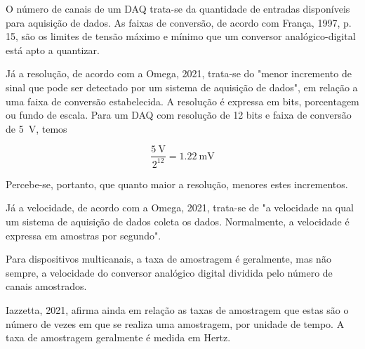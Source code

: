 \documentclass[
	12pt,				
	oneside,			
	a4paper,			
	english,			
	brazil,			
	]{abntex2ppgsi}
\begin{document}
O número de canais de um DAQ trata-se da quantidade de entradas disponíveis para aquisição de dados. As faixas de conversão, de acordo com França, 1997, p. 15, são os limites de tensão máximo e mínimo que um conversor analógico-digital está apto a quantizar.

Já a resolução, de acordo com a Omega, 2021, trata-se do "menor incremento de sinal que pode ser detectado por um sistema de aquisição de dados", em relação a uma faixa de conversão estabelecida. A resolução é expressa em bits, porcentagem ou fundo de escala. Para um DAQ com resolução de 12 bits e faixa de conversão de \SI{5}{\volt}, temos 

\begin{equation}
	\frac{\SI{5}{\volt}}{2^{12}} = \SI{1,22}{\milli\volt}
	\label{eq: Resolução de DAQ de 12 bits com faixa de conversão de 5 volts}
\end{equation}


Percebe-se, portanto, que quanto maior a resolução, menores estes incrementos. 

Já a velocidade, de acordo com a Omega, 2021, trata-se de "a velocidade na qual um sistema de aquisição de dados coleta os dados. Normalmente, a velocidade é expressa em amostras por segundo". 

Para dispositivos multicanais, a taxa de amostragem é geralmente, mas não sempre, a velocidade do conversor analógico digital dividida pelo número de canais amostrados. 

Iazzetta, 2021, afirma ainda em relação as taxas de amostragem que estas são o número de vezes em que se realiza uma amostragem, por unidade de tempo. A taxa de amostragem geralmente é medida em Hertz. 


\end{document}
